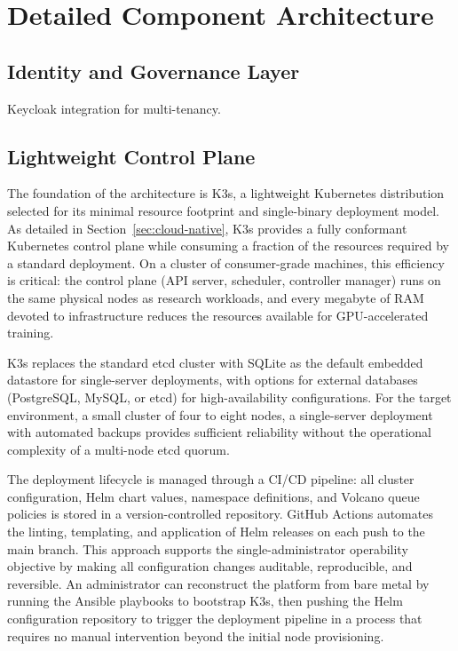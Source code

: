 \section{Detailed Component Architecture}

\subsection{Identity and Governance Layer}

Keycloak integration for multi-tenancy.

\subsection{Lightweight Control Plane}

The foundation of the architecture is K3s, a lightweight Kubernetes distribution selected for its minimal resource footprint and single-binary deployment model. As detailed in Section~\ref{sec:cloud-native}, K3s provides a fully conformant Kubernetes control plane while consuming a fraction of the resources required by a standard deployment. On a cluster of consumer-grade machines, this efficiency is critical: the control plane (API server, scheduler, controller manager) runs on the same physical nodes as research workloads, and every megabyte of RAM devoted to infrastructure reduces the resources available for GPU-accelerated training.

K3s replaces the standard etcd cluster with SQLite as the default embedded datastore for single-server deployments, with options for external databases (PostgreSQL, MySQL, or etcd) for high-availability configurations. For the target environment, a small cluster of four to eight nodes, a single-server deployment with automated backups provides sufficient reliability without the operational complexity of a multi-node etcd quorum.

The deployment lifecycle is managed through a CI/CD pipeline: all cluster configuration, Helm chart values, namespace definitions, and Volcano queue policies is stored in a version-controlled repository. GitHub Actions automates the linting, templating, and application of Helm releases on each push to the main branch. This approach supports the single-administrator operability objective by making all configuration changes auditable, reproducible, and reversible. An administrator can reconstruct the platform from bare metal by running the Ansible playbooks to bootstrap K3s, then pushing the Helm configuration repository to trigger the deployment pipeline in a process that requires no manual intervention beyond the initial node provisioning.

